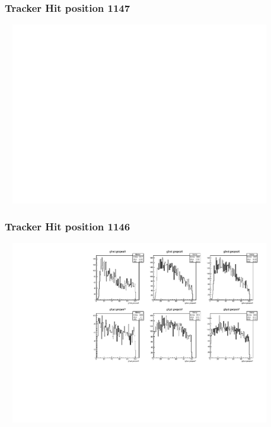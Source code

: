 \documentclass[slidestop,compress,mathserif]{beamer}
\begin{document}
\begin{frame}\frametitle{Tracker Hit position 1147}
	 \includegraphics[width=12cm,height=8cm]{Tracker_Hit_position_1147.pdf}
\end{frame}
\begin{frame}\frametitle{Tracker Hit position 1146}
	 \includegraphics[width=12cm,height=8cm]{Tracker_Hit_position_1146.pdf}
\end{frame}
\end{document}
